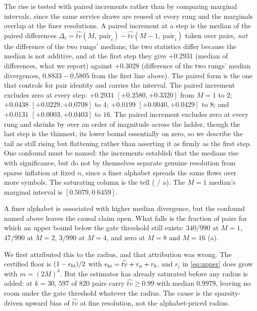 The rise is tested with paired increments rather than by comparing marginal
intervals, since the same service draws are reused at every rung and the
marginals overlap at the finer resolutions. A paired increment at a step is the
median of the paired differences
$\Delta_i = \widehat{tv}(M,\ \text{pair}_i) - \widehat{tv}(M-1,\ \text{pair}_i)$
taken over pairs, \emph{not} the difference of the two rungs' medians; the two
statistics differ because the median is not additive, and at the first step they
give $+0.2931$ (median of differences, what we report) against $+0.3028$
(difference of the two rungs' median divergences, $0.8833 - 0.5805$ from the
first line above). The paired form is the one that controls for pair identity
and carries the interval.
The paired increment excludes zero at every step: $+0.2931$ $[+0.2580,+0.3320]$ from $M{=}1$
to $2$; $+0.0438$ $[+0.0229,+0.0708]$ to $4$; $+0.0199$ $[+0.0040,+0.0429]$ to
$8$; and $+0.0131$ $[+0.0003,+0.0403]$ to $16$. The paired increment excludes
zero at every rung and shrinks by over an order of magnitude across the ladder,
though the last step is the thinnest, its lower bound
essentially on zero, so we describe the tail as still rising but flattening
rather than asserting it as firmly as the first step. One confound must be named: the increments establish that the medians rise with
significance, but do not by themselves separate genuine resolution from sparse
inflation at fixed $n$, since a finer alphabet spreads the same flows over more
symbols. The saturating column is the tell ( / a). The $M{=}1$ median's marginal interval is
$[0.5079,0.6459]$.

A finer alphabet is associated with higher median divergence, but the confound
named above leaves the causal claim open. What falls is the fraction of pairs for
which an upper bound
below the gate threshold still exists: $340/990$ at $M{=}1$, $47/990$ at
$M{=}2$, $3/990$ at $M{=}4$, and zero at $M{=}8$ and $M{=}16$
(a).

We first attributed this to the radius, and that attribution was wrong.
The certified floor is $(1-\epsilon_{\mathrm{hi}})/2$ with $\epsilon_{\mathrm{hi}}=\widehat{tv}+r_a+r_b$, and
$r_i$ in \eqref{eq:upper} does grow with $m=(2M)^k$. But the estimator has
already saturated before any radius is added: at $k{=}30$, $597$ of $820$ pairs
carry $\widehat{tv}\ge 0.99$ with median $0.9979$, leaving no room under the
gate threshold whatever the radius. The cause is the sparsity-driven upward bias
of $\widehat{tv}$ at fine resolution, not the alphabet-priced radius.

